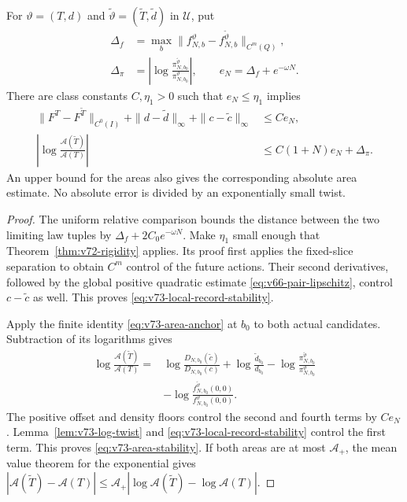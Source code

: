 \begin{proposition}
\label{prop:v73-finite-record-stability}
For $\vartheta=(T,d)$ and $\widetilde\vartheta=(\widetilde T,\widetilde d)$
in $\mathscr U$, put
\begin{align*}
 \Delta_f&=\max_b\|f^\vartheta_{N,b}-
                       f^{\widetilde\vartheta}_{N,b}\|_{C^m(Q)},\\
 \Delta_\pi&=\left|\log\frac{\pi^{\widetilde\vartheta}_{N,b_0}}
                                      {\pi^\vartheta_{N,b_0}}\right|,
 \qquad e_N=\Delta_f+e^{-\omega N}.
\end{align*}
There are class constants $C,\eta_1>0$ such that $e_N\le\eta_1$ implies
\begin{align}
 \|F^T-F^{\widetilde T}\|_{C^0(I)}
 +\|d-\widetilde d\|_\infty+\|c-\widetilde c\|_\infty
                         &\le Ce_N,\label{eq:v73-local-record-stability}\\
 \left|\log\frac{\mathcal A(\widetilde T)}{\mathcal A(T)}\right|
                         &\le C(1+N)e_N+\Delta_\pi.
                         \label{eq:v73-area-stability}
\end{align}
An upper bound for the areas also gives the corresponding absolute area
estimate.  No absolute error is divided by an exponentially small twist.
\end{proposition}
\begin{proof}
The uniform relative comparison bounds the distance between the two
limiting law tuples by $\Delta_f+2C_0e^{-\omega N}$.  Make $\eta_1$
small enough that Theorem~\ref{thm:v72-rigidity} applies.  Its proof
first applies the fixed-slice separation to obtain $C^m$ control of the
future actions.  Their second derivatives, followed by the global
positive quadratic estimate \eqref{eq:v66-pair-lipschitz}, control
$c-\widetilde c$ as well.  This proves
\eqref{eq:v73-local-record-stability}.

Apply the finite identity \eqref{eq:v73-area-anchor} at $b_0$ to
both actual candidates.  Subtraction of its logarithms gives
\begin{align*}
 \log\frac{\mathcal A(\widetilde T)}{\mathcal A(T)}
 ={}&\log\frac{D_{N,b_0}(\widetilde c)}{D_{N,b_0}(c)}
       +\log\frac{\widetilde d_{b_0}}{d_{b_0}}
       -\log\frac{\pi^{\widetilde\vartheta}_{N,b_0}}
                       {\pi^\vartheta_{N,b_0}}\\
    &-\log\frac{f^{\widetilde\vartheta}_{N,b_0}(0,0)}
                       {f^\vartheta_{N,b_0}(0,0)}.
\end{align*}
The positive offset and density floors control the second and fourth
terms by $Ce_N$.  Lemma~\ref{lem:v73-log-twist} and
\eqref{eq:v73-local-record-stability} control the first term.
This proves \eqref{eq:v73-area-stability}.  If both areas are at most
$\mathcal A_+$, the mean value theorem for the exponential gives
$|\mathcal A(\widetilde T)-\mathcal A(T)|\le
\mathcal A_+|\log\mathcal A(\widetilde T)-\log\mathcal A(T)|$.
\end{proof}

